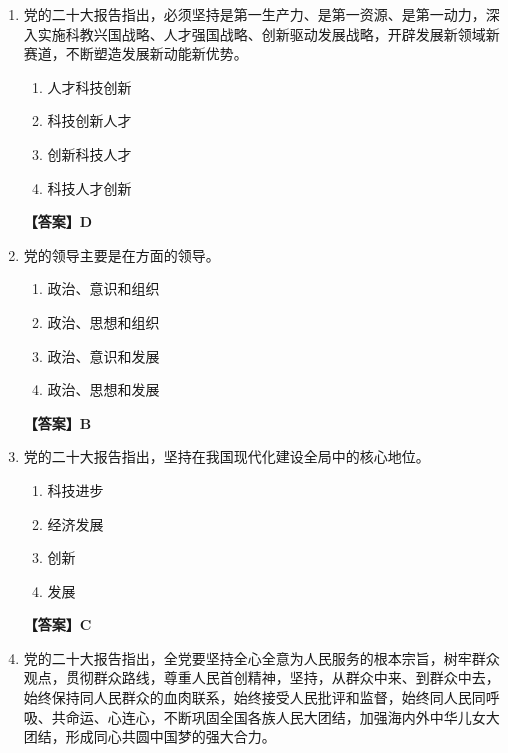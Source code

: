 \documentclass[UTF8,11pt,a4paper]{ctexart}
\begin{document}
\begin{enumerate}[label=\textbf{\arabic*.}, leftmargin=2.5em, itemsep=0.7em]
\begin{enumerate}[label=\Alph*., leftmargin=2em, itemsep=0.1em, topsep=0.15em]
\item 坚持社会主义道路
\item 坚持人民民主专政
\item 坚持改革开放
\item 坚持马克思列宁主义、毛泽东思想
\end{enumerate}
\textbf{【答案】C}
\item 党的二十大报告指出，必须坚持\allowbreak\underline{\hspace{4em}}是第一生产力、\allowbreak\underline{\hspace{4em}}是第一资源、\allowbreak\underline{\hspace{4em}}是第一动力，深入实施科教兴国战略、人才强国战略、创新驱动发展战略，开辟发展新领域新赛道，不断塑造发展新动能新优势。
\begin{enumerate}[label=\Alph*., leftmargin=2em, itemsep=0.1em, topsep=0.15em]
\item 人才科技创新
\item 科技创新人才
\item 创新科技人才
\item 科技人才创新
\end{enumerate}
\textbf{【答案】D}
\item 党的领导主要是在\allowbreak\underline{\hspace{4em}}方面的领导。
\begin{enumerate}[label=\Alph*., leftmargin=2em, itemsep=0.1em, topsep=0.15em]
\item 政治、意识和组织
\item 政治、思想和组织
\item 政治、意识和发展
\item 政治、思想和发展
\end{enumerate}
\textbf{【答案】B}
\item 党的二十大报告指出，坚持\allowbreak\underline{\hspace{4em}}在我国现代化建设全局中的核心地位。
\begin{enumerate}[label=\Alph*., leftmargin=2em, itemsep=0.1em, topsep=0.15em]
\item 科技进步
\item 经济发展
\item 创新
\item 发展
\end{enumerate}
\textbf{【答案】C}
\item 党的二十大报告指出，全党要坚持全心全意为人民服务的根本宗旨，树牢群众观点，贯彻群众路线，尊重人民首创精神，坚持\allowbreak\underline{\hspace{4em}}，从群众中来、到群众中去，始终保持同人民群众的血肉联系，始终接受人民批评和监督，始终同人民同呼吸、共命运、心连心，不断巩固全国各族人民大团结，加强海内外中华儿女大团结，形成同心共圆中国梦的强大合力。

\end{enumerate}
\end{document}
